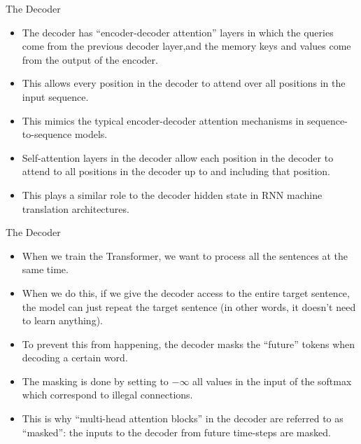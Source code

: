 \documentclass[handout]{beamer}
\begin{document}
\begin{frame}{The Decoder}
\begin{scriptsize}
\begin{itemize}



\item The decoder has ``encoder-decoder attention'' layers in which the queries come from the previous decoder layer,and the memory keys and values come from the output of the encoder.

\item This allows every position in the decoder to attend over all positions in the input sequence.

\item This mimics the typical encoder-decoder attention mechanisms in sequence-to-sequence models.

\item Self-attention layers in the decoder allow each position in the decoder to attend to all positions in the decoder up to and including that position.

 \item This plays a similar role to the decoder hidden state in RNN machine translation architectures.


 
\end{itemize}

\end{scriptsize}

\end{frame}





\begin{frame}{The Decoder}
\begin{scriptsize}
\begin{itemize}
 \item When we train the Transformer, we want to process all the sentences at the same time. 
 
 \item When we do this, if we give the decoder access to the entire target sentence, the model can just repeat the target sentence (in other words, it doesn't need to learn anything).
 
 \item To prevent this from happening, the decoder masks the ``future'' tokens when decoding a certain word.

  \item The masking is done by setting to $- \infty$ all values in the input of the softmax which correspond to illegal connections.
 \item This is why ``multi-head attention blocks'' in the decoder are referred to as ``masked'': the inputs to the decoder from future time-steps are masked.

\end{itemize}

\end{scriptsize}

\end{frame}
\end{document}
